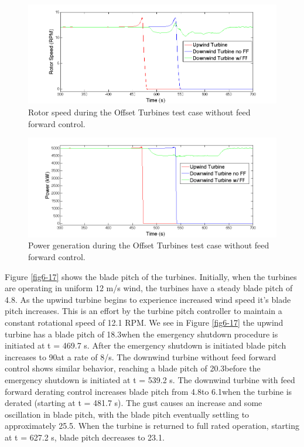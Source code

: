\begin{figure}[ht] 
	\centering
		\includegraphics[width = \linewidth]{Figures/ch6Figures/fig6-15.png}

	\caption{Rotor speed during the Offset Turbines test case without feed forward control.}
\end{figure}
\begin{figure}[ht] \label{fig6-16}
	\centering
		\includegraphics[width = \linewidth]{Figures/ch6Figures/fig6-16.png}

	\caption{Power generation during the Offset Turbines test case without feed forward control.}
	\label{fig6-15}
\end{figure}

Figure \ref{fig6-17} shows the blade pitch of the turbines. Initially, when the turbines are operating in uniform 12 m/s wind, the turbines have a steady blade pitch of 4.8\degree. As the upwind turbine begins to experience increased wind speed it's blade pitch increases. This is an effort by the turbine pitch controller to maintain a constant rotational speed of 12.1 RPM. We see in Figure \ref{fig6-17} the upwind turbine has a blade pitch of 18.3\degree when the emergency shutdown procedure is initiated at t = 469.7 s. After the emergency shutdown is initiated blade pitch increases to 90\degree at a rate of 8\degree /s. The downwind turbine without feed forward control shows similar behavior, reaching a blade pitch of 20.3\degree before the emergency shutdown is initiated at t = 539.2 s. The downwind turbine with feed forward derating control increases blade pitch from 4.8\degree to 6.1\degree when the turbine is derated (starting at t = 481.7 s). The gust causes an increase and some oscillation in blade pitch, with the blade pitch eventually settling to approximately 25.5\degree. When the turbine is returned to full rated operation, starting at t = 627.2 s, blade pitch decreases to 23.1\degree.

